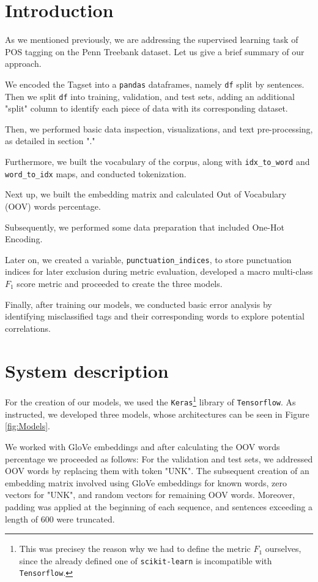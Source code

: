 \documentclass[11pt]{article}
\begin{document}
\section{Introduction}

As we mentioned previously, we are addressing the supervised learning task of POS tagging on the Penn Treebank dataset. Let us give a brief summary of our approach.

We encoded the Tagset into a \texttt{pandas} dataframes, namely \texttt{df} split by sentences. Then we split \texttt{df} into training, validation, and test sets, adding an additional "split" column to identify each piece of data with its corresponding dataset.

Then, we performed basic data inspection, visualizations, and text pre-processing, as detailed in section "."

Furthermore, we built the vocabulary of the corpus, along with \texttt{idx\_to\_word} and \texttt{word\_to\_idx} maps, and conducted tokenization.

Next up, we built the embedding matrix and calculated Out of Vocabulary (OOV) words percentage.

Subsequently, we performed some data preparation that included One-Hot Encoding.

Later on, we created a variable, \texttt{punctuation\_indices}, to store punctuation indices for later exclusion during metric evaluation, developed a macro multi-class $F_1$ score metric and proceeded to create the three models.

Finally, after training our models, we conducted basic error analysis by identifying misclassified tags and their corresponding words to explore potential correlations.


\section{System description}
\label{sec:system}

For the creation of our models, we used the \texttt{Keras}\footnote{This was precisey the reason why we had to define the metric $F_1$ ourselves, since the already defined one of \texttt{scikit-learn} is incompatible with \texttt{Tensorflow}.} library of \texttt{Tensorflow}. As instructed, we developed three models, whose architectures can be seen in Figure \ref{fig:Models}.

We worked with GloVe embeddings and after calculating the OOV words percentage we proceeded as follows: For the validation and test sets, we addressed OOV words by replacing them with token "UNK". The subsequent creation of an embedding matrix involved using GloVe embeddings for known words, zero vectors for "UNK", and random vectors for remaining OOV words. Moreover, padding was applied at the beginning of each sequence, and sentences exceeding a length of 600 were truncated.
\end{document}
